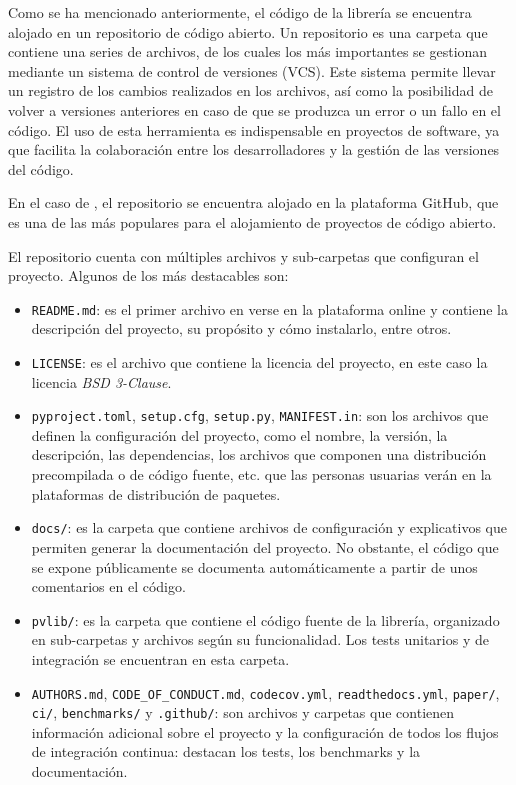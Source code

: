 Como se ha mencionado anteriormente, el código de la librería \pvlibpy{} se encuentra alojado en un \gls{repositorio} de código abierto. Un repositorio es una carpeta que contiene una series de archivos, de los cuales los más importantes se gestionan mediante un sistema de control de versiones (\gls{VCS}). Este sistema permite llevar un registro de los cambios realizados en los archivos, así como la posibilidad de volver a versiones anteriores en caso de que se produzca un error o un fallo en el código. El uso de esta herramienta es indispensable en proyectos de software, ya que facilita la colaboración entre los desarrolladores y la gestión de las versiones del código.

En el caso de \pvlibpy, el repositorio se encuentra alojado en la plataforma GitHub, que es una de las más populares para el alojamiento de proyectos de código abierto.

El repositorio cuenta con múltiples archivos y sub-carpetas que configuran el proyecto. Algunos de los más destacables son:

\begin{itemize}
    \item \texttt{README.md}: es el primer archivo en verse en la plataforma online y contiene la descripción del proyecto, su propósito y cómo instalarlo, entre otros.
    \item \texttt{LICENSE}: es el archivo que contiene la \gls{licencia} del proyecto, en este caso la licencia \textit{BSD 3-Clause}.
    \item \texttt{pyproject.toml}, \texttt{setup.cfg}, \texttt{setup.py}, \texttt{MANIFEST.in}: son los archivos que definen la configuración del proyecto, como el nombre, la versión, la descripción, las dependencias, los archivos que componen una distribución precompilada o de código fuente, etc. que las personas usuarias verán en la plataformas de distribución de paquetes.
    \item \texttt{docs/}: es la carpeta que contiene archivos de configuración y explicativos que permiten generar la documentación del proyecto. No obstante, el código que se expone públicamente se documenta automáticamente a partir de unos comentarios en el código.
    \item \texttt{pvlib/}: es la carpeta que contiene el código fuente de la librería, organizado en sub-carpetas y archivos según su funcionalidad. Los tests unitarios y de integración se encuentran en esta carpeta.
    \item \texttt{AUTHORS.md}, \texttt{CODE\_OF\_CONDUCT.md}, \texttt{codecov.yml}, \texttt{readthedocs.yml}, \texttt{paper/}, \texttt{ci/}, \texttt{benchmarks/} y \texttt{.github/}: son archivos y carpetas que contienen información adicional sobre el proyecto y la configuración de todos los flujos de integración continua: destacan los tests, los benchmarks y la documentación.

\end{itemize}

